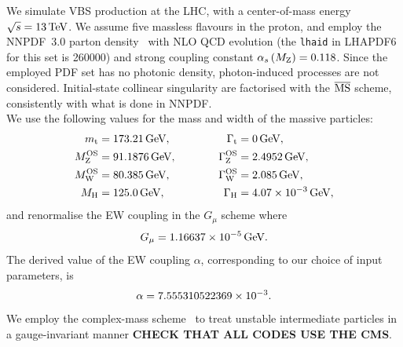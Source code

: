 We simulate VBS production at the LHC, with a center-of-mass energy $\sqrt s = 13 \,\text{TeV}$. We assume five massless flavours in the proton, and employ the NNPDF~3.0 parton 
density~\cite{Ball:2014uwa}
with NLO QCD evolution (the {\tt lhaid} in LHAPDF6~\cite{Buckley:2014ana} for this set is 260000) and strong coupling constant $\alpha_s\left( M_\text{Z} \right) = 0.118$. Since
the employed PDF set has no photonic density, photon-induced processes are not considered. Initial-state collinear singularity are factorised with the  ${\overline{\rm MS}}$ 
scheme, consistently with what is done in NNPDF.\\
We use the following values for the mass and width of the massive particles:
% 
\begin{alignat}{2}
                  m_\text{t}   &=  173.21\,\text{GeV},       & \quad \quad \quad \Gamma_\text{t} &= 0 \,\text{GeV},  \nonumber \\
                M_\text{Z}^\text{OS} &=  91.1876\,\text{GeV},      & \quad \quad \quad \Gamma_\text{Z}^\text{OS} &= 2.4952\,\text{GeV},  \nonumber \\
                M_\text{W}^\text{OS} &=  80.385\,\text{GeV},       & \Gamma_\text{W}^\text{OS} &= 2.085\,\text{GeV},  \nonumber \\
                M_{\rm H} &=  125.0\,\text{GeV},       &  \Gamma_\text{H}   &=  4.07 \times 10^{-3}\,\text{GeV},
\end{alignat}
and renormalise the EW coupling in the $G_\mu$ scheme \cite{Denner:2000bj} where
\begin{equation}
    G_{\mu}    = 1.16637\times 10^{-5}\,\text{GeV}.
\end{equation}
The derived value of the EW coupling $\alpha$, corresponding to our choice of input parameters, is 
\begin{equation}
 \alpha = 7.555310522369 \times 10^{-3}. \\
\end{equation}
We employ the complex-mass scheme~\cite{Denner:1999gp,Denner:2005fg} to treat unstable intermediate particles in a gauge-invariant manner {\bf CHECK THAT ALL CODES USE THE CMS}.\\

